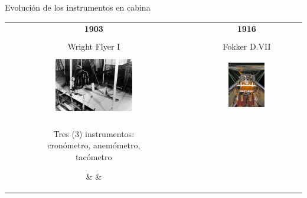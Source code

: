 
\begin{frame}{Evoluci\'on de los instrumentos en cabina}
  
  \begin{tabular}{ccc}
    {\bf \large 1903} & & {\bf \large 1916} \\ & & \\
	{Wright Flyer I} & & {Fokker D.VII} \\ & & \\
    \includegraphics[width=0.45\textwidth]{imagenes/1.1.introduccion/wright_brothers_instruments.jpg}
	& \hspace{2.5mm}
	&\includegraphics[width=0.35\textwidth]{imagenes/1.1.introduccion/005-fokker-d-vii.jpg} \\ & & \\
\parbox{0.4\textwidth}{\footnotesize
	Tres (3) instrumentos: \\
	\mbox{cron\'ometro}, anem\'ometro,\\ tac\'ometro}
	& & \\
	  \\
  \end{tabular}

\end{frame}


